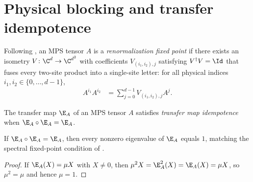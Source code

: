 \section{Physical blocking and transfer idempotence}

\begin{definition}
    \label{def:physical_blocking_isometry}
    \leanok
    Following \cite[Definition~3.2]{Cirac2016MPDO_arXiv}, an MPS tensor $A$ is a
    \emph{renormalization fixed point} if there exists an isometry
    $V\colon \C^d\to\C^{d^2}$ with coefficients $V_{(i_1,i_2),j}$ satisfying
    $V^\dagger V=\Id$ that fuses every two-site product into a single-site
    letter: for all physical indices $i_1,i_2\in\{0,\ldots,d-1\}$,
    \begin{align}
        A^{i_1}A^{i_2}
         & =\sum_{j=0}^{d-1}V_{(i_1,i_2),j}A^j.
        \label{eq:corr_physical_blocking_isometry}
    \end{align}
\end{definition}

\begin{definition}\label{def:mps_transfer_idempotence}
    \leanok
    The transfer map $\E_A$ of an MPS tensor $A$ satisfies \emph{transfer map idempotence} when
    $\E_A\circ\E_A=\E_A$.
\end{definition}

\begin{lemma}
    \label{thm:transfer_idempotent_eigenvalue_eq_one}
    \leanok
    If $\E_A\circ\E_A=\E_A$, then every nonzero eigenvalue of $\E_A$ equals
    $1$, matching the spectral fixed-point condition of
    \cite[Section~III.A]{Cirac2021Matrix}.
\end{lemma}

\begin{proof}\leanok
    If $\E_A(X)=\mu X$ with $X\neq0$, then $\mu^2X=\E_A^2(X)=\E_A(X)=\mu X$,
    so $\mu^2=\mu$ and hence $\mu=1$.
\end{proof}

